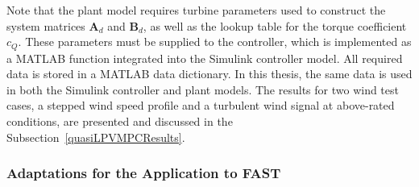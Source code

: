 %
Note that the plant model requires turbine parameters used to construct the system matrices \(\bm{A}_d\) and \(\bm{B}_d\), as well as the lookup table for the torque coefficient \(c_Q\). These parameters must be supplied to the controller, which is implemented as a MATLAB function integrated into the Simulink controller model. All required data is stored in a MATLAB data dictionary. In this thesis, the same data is used in both the Simulink controller and plant models. The results for two wind test cases, a stepped wind speed profile and a turbulent wind signal at above-rated conditions, are presented and discussed in the Subsection~\ref{quasiLPVMPCResults}.

\subsubsection{Adaptations for the Application to FAST}\label{sec:qLMPCFAST}

